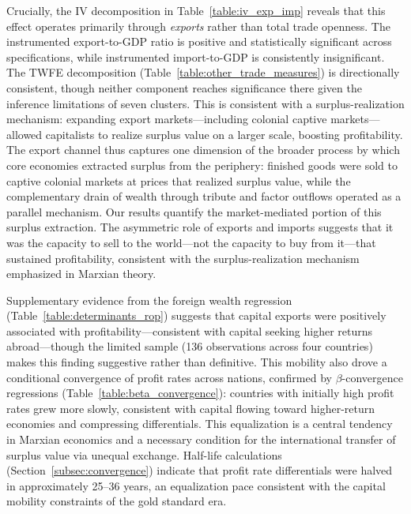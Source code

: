 \documentclass[10pt]{article}
\begin{document}
\par Crucially, the IV decomposition in Table~\ref{table:iv_exp_imp} reveals that this effect operates primarily through \emph{exports} rather than total trade openness. The instrumented export-to-GDP ratio is positive and statistically significant across specifications, while instrumented import-to-GDP is consistently insignificant. The TWFE decomposition (Table~\ref{table:other_trade_measures}) is directionally consistent, though neither component reaches significance there given the inference limitations of seven clusters. This is consistent with a surplus-realization mechanism: expanding export markets---including colonial captive markets---allowed capitalists to realize surplus value on a larger scale, boosting profitability. The export channel thus captures one dimension of the broader process by which core economies extracted surplus from the periphery: finished goods were sold to captive colonial markets at prices that realized surplus value, while the complementary drain of wealth through tribute and factor outflows \citep{bora2025drain, patnaik2000new} operated as a parallel mechanism. Our results quantify the market-mediated portion of this surplus extraction. The asymmetric role of exports and imports suggests that it was the capacity to sell to the world---not the capacity to buy from it---that sustained profitability, consistent with the surplus-realization mechanism emphasized in Marxian theory.

\par Supplementary evidence from the foreign wealth regression (Table~\ref{table:determinants_rop}) suggests that capital exports were positively associated with profitability---consistent with capital seeking higher returns abroad---though the limited sample (136 observations across four countries) makes this finding suggestive rather than definitive. This mobility also drove a conditional convergence of profit rates across nations, confirmed by $\beta$-convergence regressions (Table~\ref{table:beta_convergence}): countries with initially high profit rates grew more slowly, consistent with capital flowing toward higher-return economies and compressing differentials. This equalization is a central tendency in Marxian economics and a necessary condition for the international transfer of surplus value via unequal exchange. Half-life calculations (Section~\ref{subsec:convergence}) indicate that profit rate differentials were halved in approximately 25--36 years, an equalization pace consistent with the capital mobility constraints of the gold standard era.
\end{document}

